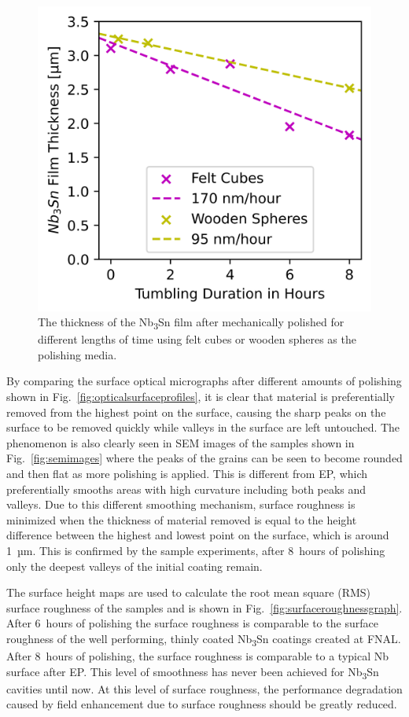 \documentclass[reprint,amsmath,amssymb,aps]{revtex4-2}%
\begin{document}
\begin{figure}[t]%
\centering%
\includegraphics[width=0.8\columnwidth]{../doc/figs/Material_Removal_Graph.png}%
\caption{The thickness of the Nb\textsubscript{3}Sn film after mechanically polished for different lengths of time using felt cubes or wooden spheres as the polishing media.}%
\label{fig:materialremovalgraph}%
\end{figure}

By comparing the surface optical micrographs after different amounts of polishing shown in Fig.~\ref{fig:opticalsurfaceprofiles}, it is clear that material is preferentially removed from the highest point on the surface, causing the sharp peaks on the surface to be removed quickly while valleys in the surface are left untouched. The phenomenon is also clearly seen in SEM images of the samples shown in Fig.~\ref{fig:semimages} where the peaks of the grains can be seen to become rounded and then flat as more polishing is applied. This is different from EP, which preferentially smooths areas with high curvature including both peaks and valleys. Due to this different smoothing mechanism, surface roughness is minimized when the thickness of material removed is equal to the height difference between the highest and lowest point on the surface, which is around 1~µm. This is confirmed by the sample experiments, after 8~hours of polishing only the deepest valleys of the initial coating remain.

The surface height maps are used to calculate the root mean square (RMS) surface roughness of the samples and is shown in Fig.~\ref{fig:surfaceroughnessgraph}. After 6~hours of polishing the surface roughness is comparable to the surface roughness of the well performing, thinly coated Nb\textsubscript{3}Sn coatings created at FNAL\cite{posen2021advances}. After 8~hours of polishing, the surface roughness is comparable to a typical Nb surface after EP. This level of smoothness has never been achieved for Nb\textsubscript{3}Sn cavities until now. At this level of surface roughness, the performance degradation caused by field enhancement due to surface roughness should be greatly reduced.
\end{document}

